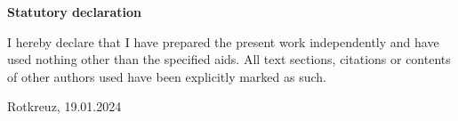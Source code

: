 \setlength{\parindent}{0pt}

\textbf{Statutory declaration} \par

I hereby declare that I have prepared the present work independently and have used nothing other than the specified aids. All text sections, citations or contents of other authors used have been explicitly marked as such. \par 
\vspace*{10.5pt} 
Rotkreuz, 19.01.2024 \underline{\hspace*{4cm}} \par 

\newpage
